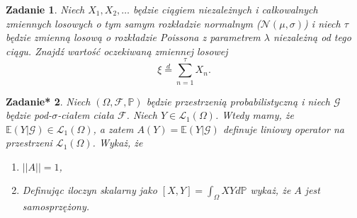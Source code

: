 \documentclass{mwart}
\newtheorem{zd}{Zadanie}
\newtheorem{zdt}[zd]{Zadanie*}
\begin{document}
\begin{zd}
	Niech $X_1, X_2, \dots $ będzie ciągiem niezależnych i całkowalnych zmiennych losowych o tym samym rozkładzie normalnym ($\mathcal{N}(\mu,\sigma)$) i niech $\tau$ będzie zmienną losową o rozkładzie Poissona z parametrem $\lambda$ niezależną od tego ciągu. Znajdź wartość oczekiwaną zmiennej losowej
	\begin{displaymath}
	\xi \stackrel{d}{=} \sum_{n=1}^\tau X_n.
	\end{displaymath}
\end{zd}

\begin{zdt}
Niech $\left(\Omega, \mathcal{F}, \mathbb{P}\right)$ będzie przestrzenią probabilistyczną i niech $\mathcal{G}$ będzie pod-$\sigma$-ciałem ciała $\mathcal{F}$. Niech $Y\in \mathcal{L}_1\left(\Omega\right)$. Wtedy mamy, że $\mathbb{E}\left(Y|\mathcal{G}\right) \in \mathcal{L}_1\left(\Omega\right)$, a zatem $A(Y) = \mathbb{E}\left(Y|\mathcal{G}\right)$ definuje liniowy operator na przestrzeni $\mathcal{L}_1\left(\Omega\right)$. Wykaż, że
\begin{enumerate}
\item $||A|| = 1$,
\item Definując iloczyn skalarny jako $[X, Y] = \int_{\Omega}XYd\mathbb{P}$ wykaż, że $A$ jest samosprzężony.
\end{enumerate}
\end{zdt}
\end{document}
